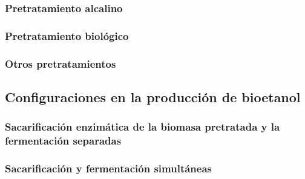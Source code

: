 \documentclass[12pt]{article}
\begin{document}
\begin{appendix}
\subsubsection{Pretratamiento alcalino }
\subsubsection{Pretratamiento biológico }
\subsubsection{Otros pretratamientos }


\subsection{Configuraciones en la producción de bioetanol}

\subsubsection{Sacarificación enzimática de la biomasa pretratada y la fermentación separadas }
\subsubsection{Sacarificación y fermentación simultáneas }
\newpage
		
		
	\end{appendix}
	
	
	
	
	
	
	
	
\end{document}
